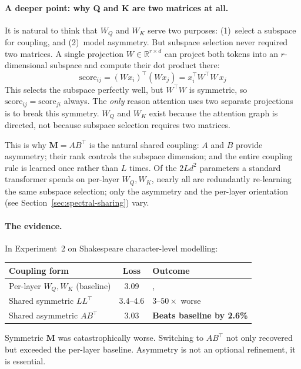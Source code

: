\documentclass[11pt, a4paper]{article}
\newcommand{\M}{\mathbf{M}}
\newcommand{\R}{\mathbb{R}}
\theoremstyle{remark}
\begin{document}
\paragraph{A deeper point: why Q and K are two matrices at all.}
It is natural to think that $W_Q$ and $W_K$ serve two purposes: (1)~select a subspace for coupling, and (2)~model asymmetry.
But subspace selection never required two matrices.
A single projection $W \in \R^{r \times d}$ can project both tokens into an $r$-dimensional subspace and compute their dot product there:
\[
\text{score}_{ij} = (Wx_i)^\top(Wx_j) = x_i^\top W^\top W \, x_j
\]
This selects the subspace perfectly well, but $W^\top W$ is symmetric, so $\text{score}_{ij} = \text{score}_{ji}$ always.
The \emph{only} reason attention uses two separate projections is to break this symmetry.
$W_Q$ and $W_K$ exist because the attention graph is directed, not because subspace selection requires two matrices.

This is why $\M = AB^\top$ is the natural shared coupling: $A$ and $B$ provide asymmetry; their rank controls the subspace dimension; and the entire coupling rule is learned once rather than $L$ times.
Of the $2Ld^2$ parameters a standard transformer spends on per-layer $W_Q, W_K$, nearly all are redundantly re-learning the same subspace selection; only the asymmetry and the per-layer orientation (see Section~\ref{sec:spectral-sharing}) vary.

\paragraph{The evidence.}
In Experiment~2 on Shakespeare character-level modelling:

\begin{center}\small
\renewcommand{\arraystretch}{1.2}
\begin{tabular}{@{}lcl@{}}
\toprule
\textbf{Coupling form} & \textbf{Loss} & \textbf{Outcome} \\
\midrule
Per-layer $W_Q, W_K$ (baseline) & 3.09 & ,  \\
Shared symmetric $LL^\top$ & 3.4--4.6 & $3$--$50\times$ worse \\
Shared asymmetric $AB^\top$ & 3.03 & \textbf{Beats baseline by 2.6\%} \\
\bottomrule
\end{tabular}
\end{center}

\noindent
Symmetric $\M$ was catastrophically worse.
Switching to $AB^\top$ not only recovered but exceeded the per-layer baseline.
Asymmetry is not an optional refinement, it is essential.
\end{document}
